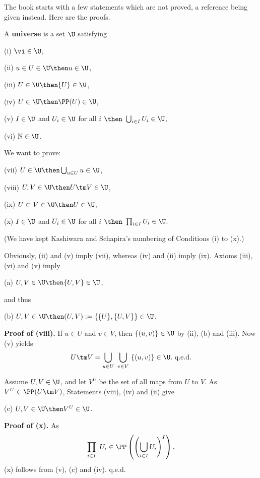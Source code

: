 \documentclass[12pt]{article}
\theoremstyle{remark}
\theoremstyle{definition}
\begin{document}

The book starts with a few statements which are not proved, a reference being given instead. Here are the proofs.

A \textbf{universe} is a set $\U$ satisfying 

(i) $\vi\in\U$,

(ii) $u\in U\in\U\then u\in\U$,

(iii) $U\in\U\then\{U\}\in\U$,

(iv) $U\in\U\then\PP(U)\in\U$,

(v) $I\in\U$ and $U_i\in\U$ for all $i$ $\then$ $\bigcup_{i\in I}U_i\in\U$,

(vi) $\mathbb N\in\U$.

\nn We want to prove:

(vii) $U\in\U\then\bigcup_{u\in U}u\in\U$,

(viii) $U,V\in\U\then U\tm V\in\U$,

(ix) $U\subset V\in\U\then U\in\U$,

(x) $I\in\U$ and $U_i\in\U$ for all $i$ $\then$ $\prod_{i\in I}U_i\in\U$.

\nn(We have kept Kashiwara and Schapira's numbering of Conditions (i) to (x).) 

\nn Obviously, (ii) and (v) imply (vii), whereas (iv) and (ii) imply (ix). Axioms (iii), (vi) and (v) imply

(a) $U,V\in\U\then\{U,V\}\in\U$,

\nn and thus

(b) $U,V\in\U\then(U,V):=\{\{U\},\{U,V\}\}\in\U$.

\nn\textbf{Proof of (viii).} If $u\in U$ and $v\in V$, then $\{(u,v)\}\in\U$ by (ii), (b) and (iii). Now (v) yields 
$$
U\tm V=\bigcup_{u\in U}\ \bigcup_{v\in V}\ \{(u,v)\}\in\U.\text{ q.e.d.} 
$$ 

Assume $U,V\in\U$, and let $V^U$ be the set of all maps from $U$ to $V$. As $V^U\in\PP(U\tm V)$, Statements (viii), (iv) and (ii) give

(c) $U,V\in\U\then V^U\in\U$.

\nn\textbf{Proof of (x).} As 
$$
\prod_{i\in I}\ U_i\in\PP\left(\left(\bigcup_{i\in I}U_i\right)^I\right),
$$
(x) follows from (v), (c) and (iv). q.e.d.


\label{defcat}
\end{document}
